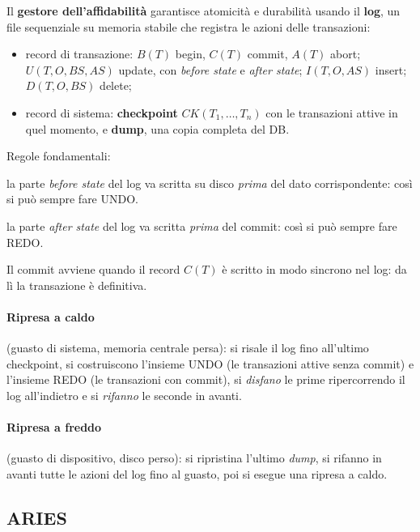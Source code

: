 \documentclass[a4paper,12pt]{article}
\begin{document}
Il \textbf{gestore dell'affidabilità} garantisce atomicità e durabilità usando
il \textbf{log}, un file sequenziale su memoria stabile che registra le azioni
delle transazioni:
\begin{itemize}
  \item record di transazione: $B(T)$ begin, $C(T)$ commit, $A(T)$ abort;
    $U(T,O,BS,AS)$ update, con \emph{before state} e \emph{after state};
    $I(T,O,AS)$ insert; $D(T,O,BS)$ delete;
  \item record di sistema: \textbf{checkpoint} $CK(T_1,\ldots,T_n)$ con le
    transazioni attive in quel momento, e \textbf{dump}, una copia completa del
    DB.
\end{itemize}
Regole fondamentali:
\begin{description}[style=nextline]
  \item[WAL (write-ahead log)] la parte \emph{before state} del log va scritta
    su disco \emph{prima} del dato corrispondente: così si può sempre fare UNDO.
  \item[Commit-precedenza] la parte \emph{after state} del log va scritta
    \emph{prima} del commit: così si può sempre fare REDO.
\end{description}
Il commit avviene quando il record $C(T)$ è scritto in modo sincrono nel log:
da lì la transazione è definitiva.

\paragraph{Ripresa a caldo} (guasto di sistema, memoria centrale persa): si
risale il log fino all'ultimo checkpoint, si costruiscono l'insieme UNDO (le
transazioni attive senza commit) e l'insieme REDO (le transazioni con
commit), si \emph{disfano} le prime ripercorrendo il log all'indietro e si
\emph{rifanno} le seconde in avanti.

\paragraph{Ripresa a freddo} (guasto di dispositivo, disco perso): si
ripristina l'ultimo \emph{dump}, si rifanno in avanti tutte le azioni del log
fino al guasto, poi si esegue una ripresa a caldo.

\subsection{ARIES}
\end{document}
